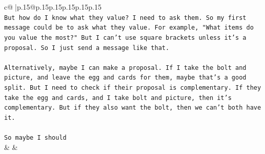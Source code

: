 \documentclass{article}
\begin{document}
{\begin{supertabular}{c@{$\;$}|p{.15\linewidth}@{}p{.15\linewidth}p{.15\linewidth}p{.15\linewidth}p{.15\linewidth}p{.15\linewidth}}
{{{\\ 
\texttt{But how do I know what they value? I need to ask them. So my first message could be to ask what they value. For example, "What items do you value the most?" But I can't use square brackets unless it's a proposal. So I just send a message like that. } \\
\\ 
\texttt{Alternatively, maybe I can make a proposal. If I take the bolt and picture, and leave the egg and cards for them, maybe that's a good split. But I need to check if their proposal is complementary. If they take the egg and cards, and I take bolt and picture, then it's complementary. But if they also want the bolt, then we can't both have it. } \\
\\ 
\texttt{So maybe I should} \\
            }
        }
    }
    & & \\ \\


\end{supertabular}}
\end{document}
